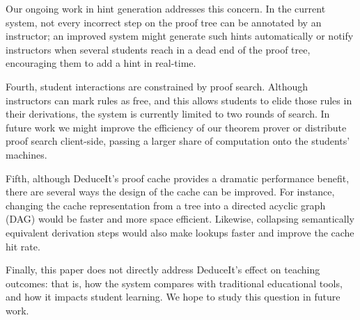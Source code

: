 \documentclass{sigchi}
\begin{document}
Our ongoing work in hint generation addresses this concern. In the current system, not every incorrect step on the proof tree can be annotated by an instructor; an improved system might generate such hints automatically or notify instructors when several students reach in a dead end of the proof tree, encouraging them to add a hint in real-time.

Fourth, student interactions are constrained by proof search. Although instructors can mark rules as free, and this allows students to elide those rules in their derivations, the system is currently limited to two rounds of search. In future work we might improve the efficiency of our theorem prover or distribute proof search client-side, passing a larger share of computation onto the students' machines.

Fifth, although DeduceIt's proof cache provides a dramatic performance benefit, there are several ways the design of the cache can be improved. For instance, changing the cache representation from a tree into a directed acyclic graph (DAG) would be faster and more space efficient. Likewise, collapsing semantically equivalent derivation steps would also make lookups faster and improve the cache hit rate.

Finally, this paper does not directly address DeduceIt's effect on teaching outcomes: that is, how the system compares with traditional educational tools, and how it impacts student learning. We hope to study this question in future work. 







\end{document}
